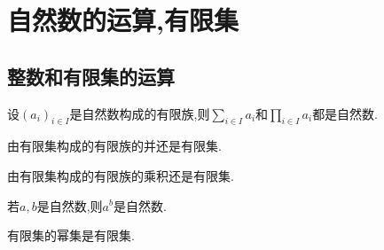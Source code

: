 \chapter{自然数的运算,有限集}

\section{整数和有限集的运算}

\begin{proposition}{}{}
	设$\left(a_{i}\right)_{i\in I}$是自然数构成的有限族,则$\sum\limits_{i\in I}a_{i}$和$\prod\limits_{i\in I}a_{i}$都是自然数.
\end{proposition}

\begin{corollary}{}{}
	由有限集构成的有限族的并还是有限集.
\end{corollary}

\begin{corollary}{}{}
	由有限集构成的有限族的乘积还是有限集.
\end{corollary}

\begin{corollary}{}{}
	若$a,b$是自然数,则$a^{b}$是自然数.
\end{corollary}

\begin{corollary}{}{}
	有限集的幂集是有限集.
\end{corollary}
































